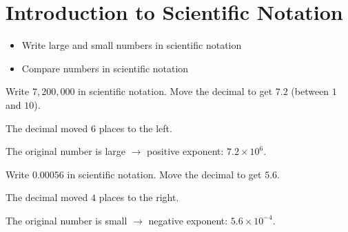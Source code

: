 \section{Introduction to Scientific Notation}

\begin{stepGoal}
\begin{itemize}
    \item Write large and small numbers in scientific notation
    \item Compare numbers in scientific notation
\end{itemize}
\end{stepGoal}

\begin{stepVocabBox}
\end{stepVocabBox}

\begin{stepsCard}
\end{stepsCard}

\begin{stepExample}{Write $7{,}200{,}000$ in scientific notation.}
     Move the decimal to get $7.2$ (between $1$ and $10$).

     The decimal moved $6$ places to the left.

     The original number is large $\to$ positive exponent: $7.2 \times 10^6$.
\end{stepExample}

\begin{stepExample}{Write $0.00056$ in scientific notation.}
     Move the decimal to get $5.6$.

     The decimal moved $4$ places to the right.

     The original number is small $\to$ negative exponent: $5.6 \times 10^{-4}$.
\end{stepExample}

